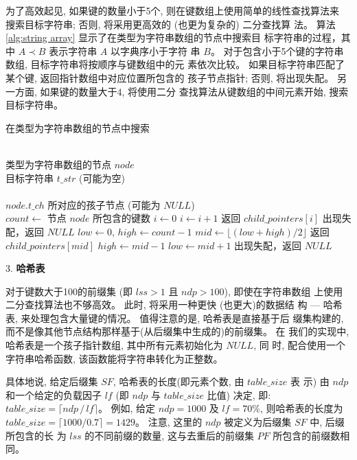 为了高效起见, 如果键的数量小于5个, 则在键数组上使用简单的线性查找算法来
搜索目标字符串; 否则, 将采用更高效的 (也更为复杂的) 二分查找算
法。 算法 \ref{alg:string array} 显示了在类型为字符串数组的节点中搜索目
标字符串的过程，其中 $A \prec B$ 表示字符串 $A$ 以字典序小于字符
串 $B$。 对于包含小于5个键的字符串数组, 目标字符串将按顺序与键数组中的元
素依次比较。 如果目标字符串匹配了某个键, 返回指针数组中对应位置所包含的
孩子节点指针; 否则, 将出现失配。 另一方面, 如果键的数量大于4, 将使用二分
查找算法从键数组的中间元素开始, 搜索目标字符串。

\begin{algorithm}
  \caption{在类型为字符串数组的节点中搜索}
  \label{alg:string array}
  \begin{algorithmic}[1]
    \REQUIRE ~~\\
    类型为字符串数组的节点 $node$ \\
    目标字符串 $t\_str$ (可能为空)\\
    \ENSURE ~~\\
     $node.t\_ch$ 所对应的孩子节点 (可能为 $NULL$)\\
    \STATE
    \STATE $count \leftarrow$ 节点 $node$  所包含的键数
    \STATE
    \STATE $i \leftarrow 0$
    \STATE $i \leftarrow i+1$
    \ENDWHILE
    \STATE 返回 $child\_pointers[i]$
    \ELSE
    \STATE 出现失配，返回 $NULL$
    \ENDIF
    \ELSE
    \STATE $low \leftarrow 0$, $high \leftarrow count-1$
    \STATE $mid \leftarrow \lfloor (low+high)/2 \rfloor$
    \STATE 返回 $child\_pointers[mid]$
    \STATE $high \leftarrow mid - 1$
    \ELSE
    \STATE $low \leftarrow mid + 1$
    \ENDIF
    \ENDWHILE
    \STATE 出现失配，返回 $NULL$
    \ENDIF
  \end{algorithmic}
\end{algorithm}

3. \textbf{哈希表}

对于键数大于100的前缀集 (即 $lss > 1$ 且 $ndp > 100$), 即使在字符串数组
上使用二分查找算法也不够高效。 此时, 将采用一种更快 (也更大)的数据结
构 --- 哈希表, 来处理包含大量键的情况。 值得注意的是, 哈希表是直接基于后
缀集构建的, 而不是像其他节点结构那样基于(从后缀集中生成的)的前缀集。 在
我们的实现中, 哈希表是一个孩子指针数组, 其中所有元素初始化为 $NULL$, 同
时, 配合使用一个字符串哈希函数, 该函数能将字符串转化为正整数。

具体地说, 给定后缀集 $SF$, 哈希表的长度(即元素个数, 由 $table\_size$ 表
示) 由 $ndp$ 和一个给定的负载因子 $lf$
(即 $ndp$ 与 $table\_size$ 比值) 决定,
即:$table\_size = \lceil ndp\,/\,lf \rceil$。 例如, 给定 $ndp = 1000$
及 $lf = 70\%$, 则哈希表的长度为$table\_size = \lceil 1000/0.7 \rceil
= 1429$。 注意, 这里的 $ndp$ 被定义为后缀集 $SF$ 中, 后缀所包含的长
为 $lss$ 的不同前缀的数量, 这与去重后的前缀集 $PF$ 所包含的前缀数相同。

